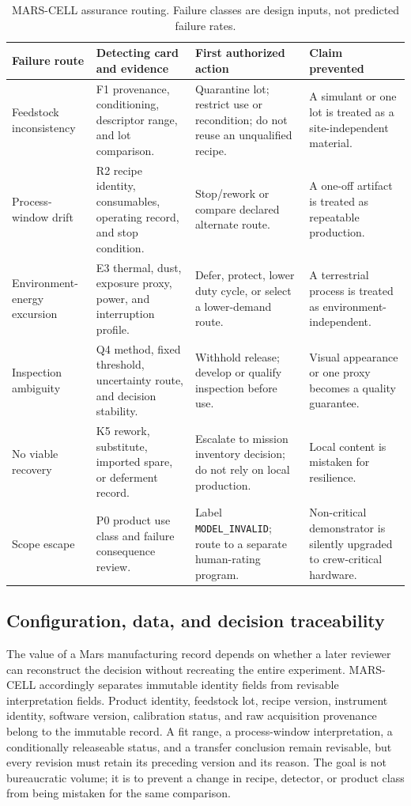 \documentclass[conference]{../../../../Conference-LaTeX-template_10-17-19/IEEEtran}
\begin{document}
\begin{table}[!t]
\caption{MARS-CELL assurance routing. Failure classes are design inputs, not predicted failure rates.}
\label{tab:faults}
\centering
\small
\begin{tabularx}{\textwidth}{lY Y Y}
\toprule
Failure route & Detecting card and evidence & First authorized action & Claim prevented \\
\midrule
Feedstock inconsistency & F1 provenance, conditioning, descriptor range, and lot comparison. & Quarantine lot; restrict use or recondition; do not reuse an unqualified recipe. & A simulant or one lot is treated as a site-independent material. \\
Process-window drift & R2 recipe identity, consumables, operating record, and stop condition. & Stop/rework or compare declared alternate route. & A one-off artifact is treated as repeatable production. \\
Environment-energy excursion & E3 thermal, dust, exposure proxy, power, and interruption profile. & Defer, protect, lower duty cycle, or select a lower-demand route. & A terrestrial process is treated as environment-independent. \\
Inspection ambiguity & Q4 method, fixed threshold, uncertainty route, and decision stability. & Withhold release; develop or qualify inspection before use. & Visual appearance or one proxy becomes a quality guarantee. \\
No viable recovery & K5 rework, substitute, imported spare, or deferment record. & Escalate to mission inventory decision; do not rely on local production. & Local content is mistaken for resilience. \\
Scope escape & P0 product use class and failure consequence review. & Label \texttt{MODEL\_INVALID}; route to a separate human-rating program. & Non-critical demonstrator is silently upgraded to crew-critical hardware. \\
\bottomrule
\end{tabularx}
\end{table}

\subsection{Configuration, data, and decision traceability}
The value of a Mars manufacturing record depends on whether a later reviewer can reconstruct the decision without recreating the entire experiment. MARS-CELL accordingly separates immutable identity fields from revisable interpretation fields. Product identity, feedstock lot, recipe version, instrument identity, software version, calibration status, and raw acquisition provenance belong to the immutable record. A fit range, a process-window interpretation, a conditionally releaseable status, and a transfer conclusion remain revisable, but every revision must retain its preceding version and its reason. The goal is not bureaucratic volume; it is to prevent a change in recipe, detector, or product class from being mistaken for the same comparison.
\end{document}
